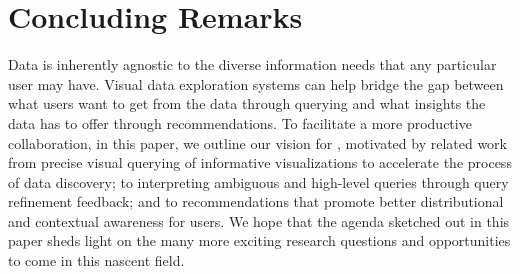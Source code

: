 \section{Concluding Remarks\label{sec:conclusion}}
\par Data is inherently agnostic to the diverse information needs that any particular user may have. 
Visual data exploration systems can 
help bridge the gap between what users want to 
get from the data through querying and 
what insights the data has to offer through recommendations. 
To facilitate a more productive collaboration, 
in this paper, we outline our vision for \vida, motivated by related work 
from precise visual querying of informative visualizations 
to accelerate the process of data discovery; 
to interpreting ambiguous and high-level queries 
through query refinement feedback; and
to recommendations that promote better distributional 
and contextual awareness for users. 
We hope that the agenda sketched out in this paper 
sheds light on the many more exciting research 
questions and opportunities 
to come in this nascent field.



